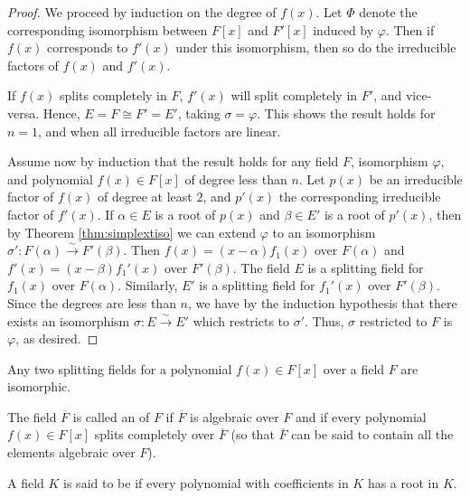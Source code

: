 \begin{proof}
    We proceed by induction on the degree of $f(x)$. Let $\Phi$ denote the corresponding isomorphism between $F[x]$ and $F'[x]$ induced by $\varphi$. Then if $f(x)$ corresponds to $f'(x)$ under this isomorphism, then so do the irreducible factors of $f(x)$ and $f'(x)$. 

    If $f(x)$ splits completely in $F$, $f'(x)$ will split completely in $F'$, and vice-versa. Hence, $E = F \cong F' = E'$, taking $\sigma = \varphi$. This shows the result holds for $n = 1$, and when all irreducible factors are linear.

    Assume now by induction that the result holds for any field $F$, isomorphism $\varphi$, and polynomial $f(x) \in F[x]$ of degree less than $n$. Let $p(x)$ be an irreducible factor of $f(x)$ of degree at least $2$, and $p'(x)$ the corresponding irreducible factor of $f'(x)$. If $\alpha \in E$ is a root of $p(x)$ and $\beta \in E'$ is a root of $p'(x)$, then by Theorem \ref{thm:simplextiso} we can extend $\varphi$ to an isomorphism $\sigma':F(\alpha)\xrightarrow{\sim}F'(\beta)$. Then $f(x) = (x-\alpha)f_1(x)$ over $F(\alpha)$ and $f'(x) = (x-\beta)f_1'(x)$ over $F'(\beta)$. The field $E$ is a splitting field for $f_1(x)$ over $F(\alpha)$. Similarly, $E'$ is a splitting field for $f_1'(x)$ over $F'(\beta)$. Since the degrees are less than $n$, we have by the induction hypothesis that there exists an isomorphism $\sigma:E\xrightarrow{\sim}E'$ which restricts to $\sigma'$. Thus, $\sigma$ restricted to $F$ is $\varphi$, as desired.
\end{proof}


\begin{corollary}
    Any two splitting fields for a polynomial $f(x) \in F[x]$ over a field $F$ are isomorphic.
\end{corollary}


\begin{definition}
    The field $\overline{F}$ is called an  of $F$ if $\overline{F}$ is algebraic over $F$ and if every polynomial $f(x) \in F[x]$ splits completely over $\overline{F}$ (so that $\overline{F}$ can be said to contain all the elements algebraic over $F$).
\end{definition}

\begin{definition}
    A field $K$ is said to be  if every polynomial with coefficients in $K$ has a root in $K$.
\end{definition}

